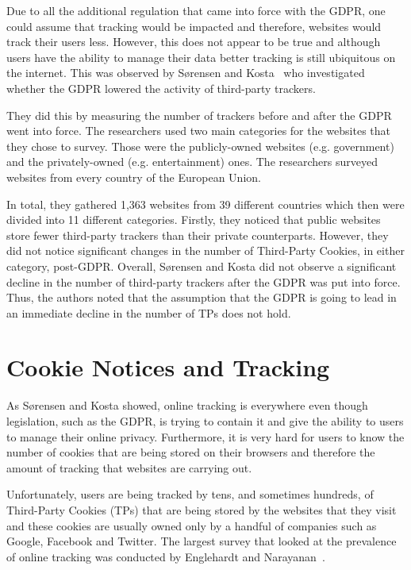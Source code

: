 \documentclass[../main.tex]{subfiles}
\begin{document}
Due to all the additional regulation that came into force with the GDPR, one could assume that tracking would be impacted and therefore, websites would track their users less. However, this does not appear to be true and although users have the ability to manage their data better tracking is still ubiquitous on the internet. This was observed by Sørensen and Kosta~\cite{sorensen2019before} who investigated whether the GDPR lowered the activity of third-party trackers. 

They did this by measuring the number of trackers before and after the GDPR went into force. The researchers used two main categories for the websites that they chose to survey. Those were the publicly-owned websites (e.g. government) and the privately-owned (e.g. entertainment) ones. The researchers surveyed websites from every country of the European Union. 

In total, they gathered 1,363 websites from 39 different countries which then were divided into 11 different categories. Firstly, they noticed that public websites store fewer third-party trackers than their private counterparts. However, they did not notice significant changes in the number of Third-Party Cookies, in either category, post-GDPR. Overall, Sørensen and Kosta did not observe a significant decline in the number of third-party trackers after the GDPR was put into force. Thus, the authors noted that the assumption that the GDPR is going to lead in an immediate decline in the number of TPs does not hold. 

\section{Cookie Notices and Tracking}
\label{sec:lit_review_tracking}
As Sørensen and Kosta showed, online tracking is everywhere even though legislation, such as the GDPR, is trying to contain it and give the ability to users to manage their online privacy. Furthermore, it is very hard for users to know the number of cookies that are being stored on their browsers and therefore the amount of tracking that websites are carrying out. 

Unfortunately, users are being tracked by tens, and sometimes hundreds, of Third-Party Cookies (TPs) that are being stored by the websites that they visit and these cookies are usually owned only by a handful of companies such as Google, Facebook and Twitter. The largest survey that looked at the prevalence of online tracking was conducted by Englehardt and Narayanan~\cite{englehardt2016online}. 
\end{document}

